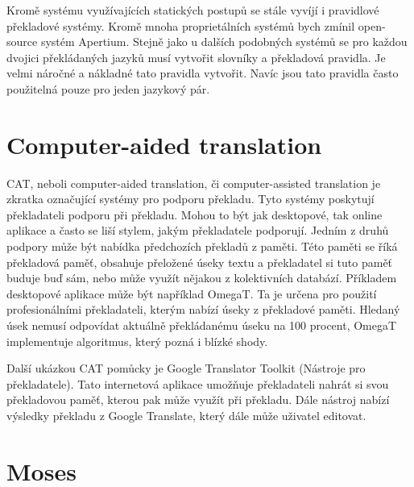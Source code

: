 Kromě systému využívajících statických postupů se stále vyvíjí i pravidlové překladové systémy. Kromě mnoha proprietálních systémů bych zmínil open-source systém Apertium. Stejně jako u dalších podobných systémů se pro každou dvojici překládaných jazyků musí vytvořit slovníky a překladová pravidla. Je velmi náročné a nákladné tato pravidla vytvořit. Navíc jsou tato pravidla často použitelná pouze pro jeden jazykový pár.

\section{Computer-aided translation}
CAT, neboli computer-aided translation, či computer-assisted translation je zkratka označující systémy pro podporu překladu. Tyto systémy poskytují překladateli podporu při překladu. Mohou to být jak desktopové, tak online aplikace a často se liší stylem, jakým překladatele podporují. Jedním z druhů podpory může být nabídka předchozích překladů z paměti. Této paměti se říká překladová paměť, obsahuje přeložené úseky textu a překladatel si tuto paměť buduje buď sám, nebo může využít nějakou z kolektivních databází. Příkladem desktopové aplikace může být například OmegaT. Ta je určena pro použití profesionálními překladateli, kterým nabízí úseky z překladové paměti. Hledaný úsek nemusí odpovídat aktuálně překládanému úseku na 100 procent, OmegaT implementuje algoritmus, který pozná i blízké shody.

Další ukázkou CAT pomůcky je Google Translator Toolkit (Nástroje pro překladatele). Tato internetová aplikace umožňuje překladateli nahrát si svou překladovou paměť, kterou pak může využít při překladu. Dále nástroj nabízí výsledky překladu z Google Translate, který dále může uživatel editovat.

\section{Moses}

